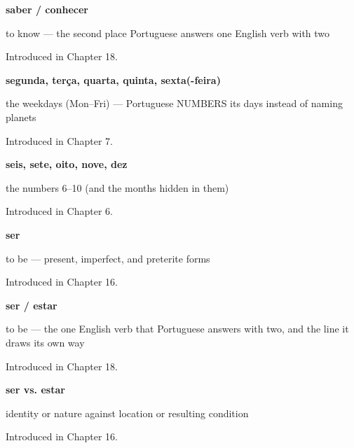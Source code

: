 \noindent\begin{minipage}[t]{\linewidth}
\raggedright
\textbf{saber / conhecer}\par
\small to know — the second place Portuguese answers one English verb with two\par
\footnotesize Introduced in Chapter 18.
\end{minipage}\par\medskip

\noindent\begin{minipage}[t]{\linewidth}
\raggedright
\textbf{segunda, terça, quarta, quinta, sexta(-feira)}\par
\small the weekdays (Mon–Fri) — Portuguese NUMBERS its days instead of naming planets\par
\footnotesize Introduced in Chapter 7.
\end{minipage}\par\medskip

\noindent\begin{minipage}[t]{\linewidth}
\raggedright
\textbf{seis, sete, oito, nove, dez}\par
\small the numbers 6–10 (and the months hidden in them)\par
\footnotesize Introduced in Chapter 6.
\end{minipage}\par\medskip

\noindent\begin{minipage}[t]{\linewidth}
\raggedright
\textbf{ser}\par
\small to be — present, imperfect, and preterite forms\par
\footnotesize Introduced in Chapter 16.
\end{minipage}\par\medskip

\noindent\begin{minipage}[t]{\linewidth}
\raggedright
\textbf{ser / estar}\par
\small to be — the one English verb that Portuguese answers with two, and the line it draws its own way\par
\footnotesize Introduced in Chapter 18.
\end{minipage}\par\medskip

\noindent\begin{minipage}[t]{\linewidth}
\raggedright
\textbf{ser vs. estar}\par
\small identity or nature against location or resulting condition\par
\footnotesize Introduced in Chapter 16.
\end{minipage}\par\medskip

